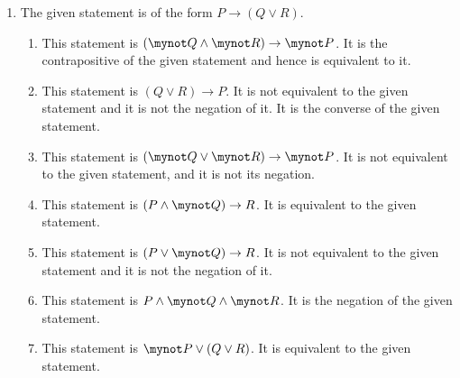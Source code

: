 \begin{enumerate}
\item The given statement is of the form $P \to \left( Q \vee R \right)$.
\begin{enumerate}
\item This statement is $\left( \mynot Q \wedge \mynot R \right) \to \mynot P$.  It is the contrapositive of the given statement and hence is equivalent to it.

\item This statement is $\left( Q \vee R \right) \to P$.  It is not equivalent to the given statement and it is not the negation of it.  It is the converse of the given statement.

\item This statement is $\left( \mynot Q \vee \mynot R \right) \to \mynot P$.  It is not equivalent to the given statement, and it is not its negation.

\item This statement is $\left( P \wedge \mynot Q \right) \to R$.  It is equivalent to the given statement.

\item This statement is $\left( P \vee \mynot Q \right) \to R$.  It is not equivalent to the given statement and it is not the negation of it.

\item This statement is $P \wedge \mynot Q \wedge \mynot R$.  It is the negation of the given statement.

\item This statement is $\mynot P \vee \left( Q \vee R \right)$.  It is equivalent to the given statement.
\end{enumerate}
\end{enumerate}


